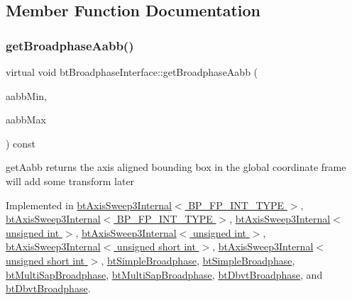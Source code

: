 \subsection{Member Function Documentation}
\mbox{\label{classbtBroadphaseInterface_ab5af9e26414f5a72a76040b8fab4d9e2}} 
\subsubsection{\texorpdfstring{get\+Broadphase\+Aabb()}{getBroadphaseAabb()}\hspace{0.1cm}{\footnotesize\ttfamily [1/2]}}
{\footnotesize\ttfamily virtual void bt\+Broadphase\+Interface\+::get\+Broadphase\+Aabb (\begin{DoxyParamCaption}\item[{bt\+Vector3 \&}]{aabb\+Min,  }\item[{bt\+Vector3 \&}]{aabb\+Max }\end{DoxyParamCaption}) const\hspace{0.3cm}{\ttfamily [pure virtual]}}

get\+Aabb returns the axis aligned bounding box in the \textquotesingle{}global\textquotesingle{} coordinate frame will add some transform later 

Implemented in \hyperlink{classbtAxisSweep3Internal_ad1e0037e1ed62ef5049389bb4e8fd5b5}{bt\+Axis\+Sweep3\+Internal$<$ B\+P\+\_\+\+F\+P\+\_\+\+I\+N\+T\+\_\+\+T\+Y\+P\+E $>$}, \hyperlink{classbtAxisSweep3Internal_ad1e0037e1ed62ef5049389bb4e8fd5b5}{bt\+Axis\+Sweep3\+Internal$<$ B\+P\+\_\+\+F\+P\+\_\+\+I\+N\+T\+\_\+\+T\+Y\+P\+E $>$}, \hyperlink{classbtAxisSweep3Internal_ad1e0037e1ed62ef5049389bb4e8fd5b5}{bt\+Axis\+Sweep3\+Internal$<$ unsigned int $>$}, \hyperlink{classbtAxisSweep3Internal_ad1e0037e1ed62ef5049389bb4e8fd5b5}{bt\+Axis\+Sweep3\+Internal$<$ unsigned int $>$}, \hyperlink{classbtAxisSweep3Internal_ad1e0037e1ed62ef5049389bb4e8fd5b5}{bt\+Axis\+Sweep3\+Internal$<$ unsigned short int $>$}, \hyperlink{classbtAxisSweep3Internal_ad1e0037e1ed62ef5049389bb4e8fd5b5}{bt\+Axis\+Sweep3\+Internal$<$ unsigned short int $>$}, \hyperlink{classbtSimpleBroadphase_a4e8e5de5df6d3125631e3d94a67ac4d2}{bt\+Simple\+Broadphase}, \hyperlink{classbtSimpleBroadphase_a4e8e5de5df6d3125631e3d94a67ac4d2}{bt\+Simple\+Broadphase}, \hyperlink{classbtMultiSapBroadphase_a37a11b7ee2889d80adaf5add6fffe782}{bt\+Multi\+Sap\+Broadphase}, \hyperlink{classbtMultiSapBroadphase_a37a11b7ee2889d80adaf5add6fffe782}{bt\+Multi\+Sap\+Broadphase}, \hyperlink{structbtDbvtBroadphase_acbd595a9434b6bb045e15ab0d36120e3}{bt\+Dbvt\+Broadphase}, and \hyperlink{structbtDbvtBroadphase_ab546a1950f0f0f30dcc897b35e656e0b}{bt\+Dbvt\+Broadphase}.

